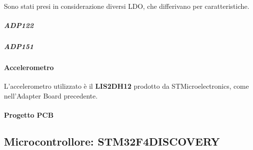 Sono stati presi in considerazione diversi LDO, che differivano per caratteristiche. 
\subparagraph{ADP122}\cite{AnalogDevicesADP122}
\subparagraph{ADP151}\cite{AnalogDevicesADP151}


\paragraph{Accelerometro} L'accelerometro utilizzato è il \textbf{LIS2DH12} prodotto da STMicroelectronics, come nell'Adapter Board precedente.
\paragraph{Progetto PCB}

\subsection{Microcontrollore: STM32F4DISCOVERY}


